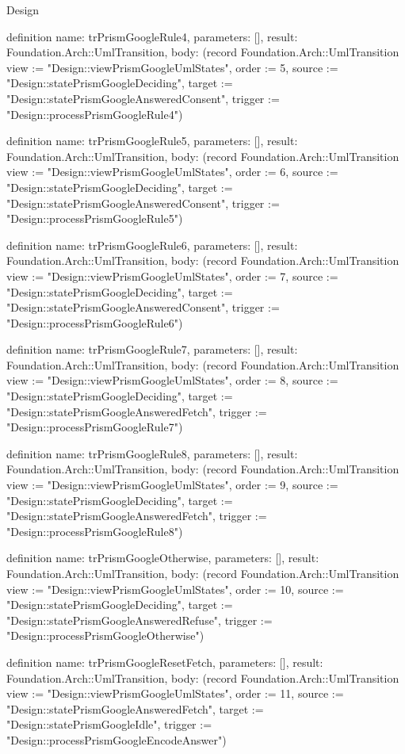 \begin{lexlean}{Design}
\begin{semanticmodule}
definition{
  name: trPrismGoogleRule4,
  parameters: [],
  result: Foundation.Arch::UmlTransition,
  body: (record Foundation.Arch::UmlTransition {view := "Design::viewPrismGoogleUmlStates", order := 5, source := "Design::statePrismGoogleDeciding", target := "Design::statePrismGoogleAnsweredConsent", trigger := "Design::processPrismGoogleRule4"})
}

definition{
  name: trPrismGoogleRule5,
  parameters: [],
  result: Foundation.Arch::UmlTransition,
  body: (record Foundation.Arch::UmlTransition {view := "Design::viewPrismGoogleUmlStates", order := 6, source := "Design::statePrismGoogleDeciding", target := "Design::statePrismGoogleAnsweredConsent", trigger := "Design::processPrismGoogleRule5"})
}

definition{
  name: trPrismGoogleRule6,
  parameters: [],
  result: Foundation.Arch::UmlTransition,
  body: (record Foundation.Arch::UmlTransition {view := "Design::viewPrismGoogleUmlStates", order := 7, source := "Design::statePrismGoogleDeciding", target := "Design::statePrismGoogleAnsweredConsent", trigger := "Design::processPrismGoogleRule6"})
}

definition{
  name: trPrismGoogleRule7,
  parameters: [],
  result: Foundation.Arch::UmlTransition,
  body: (record Foundation.Arch::UmlTransition {view := "Design::viewPrismGoogleUmlStates", order := 8, source := "Design::statePrismGoogleDeciding", target := "Design::statePrismGoogleAnsweredFetch", trigger := "Design::processPrismGoogleRule7"})
}

definition{
  name: trPrismGoogleRule8,
  parameters: [],
  result: Foundation.Arch::UmlTransition,
  body: (record Foundation.Arch::UmlTransition {view := "Design::viewPrismGoogleUmlStates", order := 9, source := "Design::statePrismGoogleDeciding", target := "Design::statePrismGoogleAnsweredFetch", trigger := "Design::processPrismGoogleRule8"})
}

definition{
  name: trPrismGoogleOtherwise,
  parameters: [],
  result: Foundation.Arch::UmlTransition,
  body: (record Foundation.Arch::UmlTransition {view := "Design::viewPrismGoogleUmlStates", order := 10, source := "Design::statePrismGoogleDeciding", target := "Design::statePrismGoogleAnsweredRefuse", trigger := "Design::processPrismGoogleOtherwise"})
}

definition{
  name: trPrismGoogleResetFetch,
  parameters: [],
  result: Foundation.Arch::UmlTransition,
  body: (record Foundation.Arch::UmlTransition {view := "Design::viewPrismGoogleUmlStates", order := 11, source := "Design::statePrismGoogleAnsweredFetch", target := "Design::statePrismGoogleIdle", trigger := "Design::processPrismGoogleEncodeAnswer"})
}


\end{semanticmodule}
\end{lexlean}
